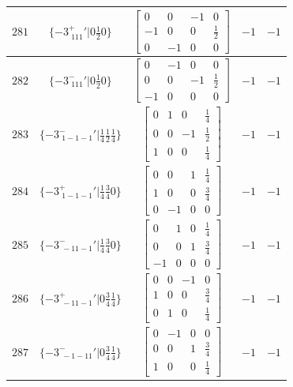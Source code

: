 \documentclass[fleqn,8pt]{jsarticle}
\begin{document}
\begin{longtable}{ccccc}
$ 281 $ & $ \{-3^{+}_{\,\,111}{}'|0 \frac{1}{2} 0\} $ & $ \begin{bmatrix} 0 & 0 & -1 & 0 \\ -1 & 0 & 0 & \frac{1}{2} \\ 0 & -1 & 0 & 0 \end{bmatrix} $ & $ -1 $ & $ -1 $ \\ \hline
$ 282 $ & $ \{-3^{-}_{\,\,111}{}'|0 \frac{1}{2} 0\} $ & $ \begin{bmatrix} 0 & -1 & 0 & 0 \\ 0 & 0 & -1 & \frac{1}{2} \\ -1 & 0 & 0 & 0 \end{bmatrix} $ & $ -1 $ & $ -1 $ \\ \hline
$ 283 $ & $ \{-3^{-}_{\,\,1-1-1}{}'|\frac{1}{4} \frac{1}{2} \frac{1}{4}\} $ & $ \begin{bmatrix} 0 & 1 & 0 & \frac{1}{4} \\ 0 & 0 & -1 & \frac{1}{2} \\ 1 & 0 & 0 & \frac{1}{4} \end{bmatrix} $ & $ -1 $ & $ -1 $ \\ \hline
$ 284 $ & $ \{-3^{+}_{\,\,1-1-1}{}'|\frac{1}{4} \frac{3}{4} 0\} $ & $ \begin{bmatrix} 0 & 0 & 1 & \frac{1}{4} \\ 1 & 0 & 0 & \frac{3}{4} \\ 0 & -1 & 0 & 0 \end{bmatrix} $ & $ -1 $ & $ -1 $ \\ \hline
$ 285 $ & $ \{-3^{-}_{\,\,-11-1}{}'|\frac{1}{4} \frac{3}{4} 0\} $ & $ \begin{bmatrix} 0 & 1 & 0 & \frac{1}{4} \\ 0 & 0 & 1 & \frac{3}{4} \\ -1 & 0 & 0 & 0 \end{bmatrix} $ & $ -1 $ & $ -1 $ \\ \hline
$ 286 $ & $ \{-3^{+}_{\,\,-11-1}{}'|0 \frac{3}{4} \frac{1}{4}\} $ & $ \begin{bmatrix} 0 & 0 & -1 & 0 \\ 1 & 0 & 0 & \frac{3}{4} \\ 0 & 1 & 0 & \frac{1}{4} \end{bmatrix} $ & $ -1 $ & $ -1 $ \\ \hline
$ 287 $ & $ \{-3^{-}_{\,\,-1-11}{}'|0 \frac{3}{4} \frac{1}{4}\} $ & $ \begin{bmatrix} 0 & -1 & 0 & 0 \\ 0 & 0 & 1 & \frac{3}{4} \\ 1 & 0 & 0 & \frac{1}{4} \end{bmatrix} $ & $ -1 $ & $ -1 $ \\ \hline

\end{longtable}
\end{document}
